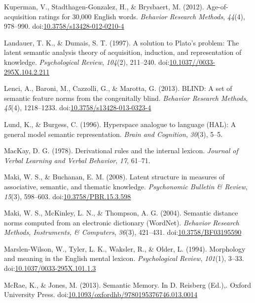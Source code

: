 \documentclass[english,,man]{apa6}
\theoremstyle{definition}
\theoremstyle{definition}
\theoremstyle{definition}
\theoremstyle{remark}
\begin{document}
\hypertarget{ref-Kuperman2012}{}
Kuperman, V., Stadthagen-Gonzalez, H., \& Brysbaert, M. (2012).
Age-of-acquisition ratings for 30,000 English words. \emph{Behavior
Research Methods}, \emph{44}(4), 978--990.
doi:\href{https://doi.org/10.3758/s13428-012-0210-4}{10.3758/s13428-012-0210-4}

\hypertarget{ref-Landauer1997}{}
Landauer, T. K., \& Dumais, S. T. (1997). A solution to Plato's problem:
The latent semantic analysis theory of acquisition, induction, and
representation of knowledge. \emph{Psychological Review}, \emph{104}(2),
211--240.
doi:\href{https://doi.org/10.1037//0033-295X.104.2.211}{10.1037//0033-295X.104.2.211}

\hypertarget{ref-Lenci2013}{}
Lenci, A., Baroni, M., Cazzolli, G., \& Marotta, G. (2013). BLIND: A set
of semantic feature norms from the congenitally blind. \emph{Behavior
Research Methods}, \emph{45}(4), 1218--1233.
doi:\href{https://doi.org/10.3758/s13428-013-0323-4}{10.3758/s13428-013-0323-4}

\hypertarget{ref-Lund1996}{}
Lund, K., \& Burgess, C. (1996). Hyperspace analogue to language (HAL):
A general model semantic representation. \emph{Brain and Cognition},
\emph{30}(3), 5--5.

\hypertarget{ref-MacKay1978}{}
MacKay, D. G. (1978). Derivational rules and the internal lexicon.
\emph{Journal of Verbal Learning and Verbal Behavior}, \emph{17},
61--71.

\hypertarget{ref-Maki2008}{}
Maki, W. S., \& Buchanan, E. M. (2008). Latent structure in measures of
associative, semantic, and thematic knowledge. \emph{Psychonomic
Bulletin \& Review}, \emph{15}(3), 598--603.
doi:\href{https://doi.org/10.3758/PBR.15.3.598}{10.3758/PBR.15.3.598}

\hypertarget{ref-Maki2004}{}
Maki, W. S., McKinley, L. N., \& Thompson, A. G. (2004). Semantic
distance norms computed from an electronic dictionary (WordNet).
\emph{Behavior Research Methods, Instruments, \& Computers},
\emph{36}(3), 421--431.
doi:\href{https://doi.org/10.3758/BF03195590}{10.3758/BF03195590}

\hypertarget{ref-Marslen-Wilson1994}{}
Marslen-Wilson, W., Tyler, L. K., Waksler, R., \& Older, L. (1994).
Morphology and meaning in the English mental lexicon.
\emph{Psychological Review}, \emph{101}(1), 3--33.
doi:\href{https://doi.org/10.1037/0033-295X.101.1.3}{10.1037/0033-295X.101.1.3}

\hypertarget{ref-McRae2013}{}
McRae, K., \& Jones, M. (2013). Semantic Memory. In D. Reisberg (Ed.),.
Oxford University Press.
doi:\href{https://doi.org/10.1093/oxfordhb/9780195376746.013.0014}{10.1093/oxfordhb/9780195376746.013.0014}
\end{document}
